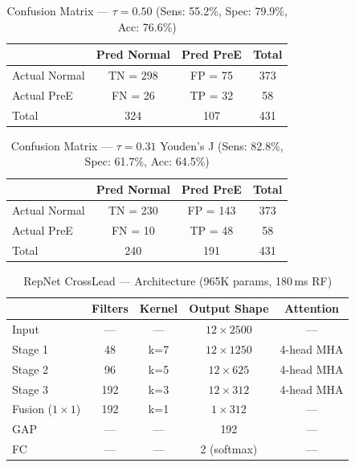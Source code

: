 \begin{table}[htbp]
\centering
\caption{Confusion Matrix --- $\tau = 0.50$ (Sens: 55.2\%, Spec: 79.9\%, Acc: 76.6\%)}
\label{tab:confusion_tau050}
\begin{tabular}{lccc}
\toprule
 & \textbf{Pred Normal} & \textbf{Pred PreE} & \textbf{Total} \\
\midrule
Actual Normal & TN = 298 & FP = 75  & 373 \\
Actual PreE   & FN = 26  & TP = 32  & 58  \\
\midrule
Total         & 324      & 107      & 431 \\
\bottomrule
\end{tabular}
\end{table}

\begin{table}[htbp]
\centering
\caption{Confusion Matrix --- $\tau = 0.31$ Youden's J (Sens: 82.8\%, Spec: 61.7\%, Acc: 64.5\%)}
\label{tab:confusion_youden}
\begin{tabular}{lccc}
\toprule
 & \textbf{Pred Normal} & \textbf{Pred PreE} & \textbf{Total} \\
\midrule
Actual Normal & TN = 230 & FP = 143 & 373 \\
Actual PreE   & FN = 10  & TP = 48  & 58  \\
\midrule
Total         & 240      & 191      & 431 \\
\bottomrule
\end{tabular}
\end{table}

\begin{table}[htbp]
\centering
\caption{RepNet CrossLead --- Architecture (965K params, 180\,ms RF)}
\label{tab:architecture}
\begin{tabular}{lcccc}
\toprule
 & \textbf{Filters} & \textbf{Kernel} & \textbf{Output Shape} & \textbf{Attention} \\
\midrule
Input          & ---  & ---  & $12 \times 2500$ & ---        \\
Stage 1        & 48   & k=7  & $12 \times 1250$ & 4-head MHA \\
Stage 2        & 96   & k=5  & $12 \times 625$  & 4-head MHA \\
Stage 3        & 192  & k=3  & $12 \times 312$  & 4-head MHA \\
Fusion ($1\times1$) & 192  & k=1  & $1 \times 312$   & ---        \\
GAP            & ---  & ---  & 192              & ---        \\
FC             & ---  & ---  & 2 (softmax)      & ---        \\
\bottomrule
\end{tabular}
\end{table}

